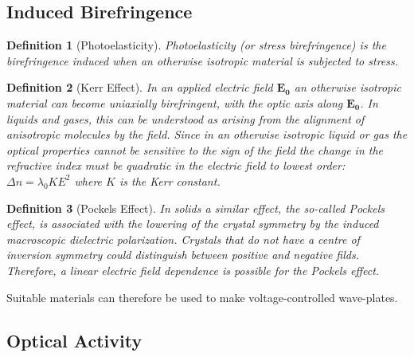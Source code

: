 \documentclass[a4paper]{article}
\theoremstyle{new}
\newtheorem{defi}{Definition}[section]
\begin{document}
\subsection{Induced Birefringence}
\begin{defi}[Photoelasticity]
Photoelasticity (or stress birefringence) is the birefringence induced when an otherwise isotropic material is subjected to stress.
\end{defi}
\begin{defi}[Kerr Effect]
In an applied electric field $\mathbf{E_0}$ an otherwise isotropic material can become uniaxially birefringent, with the optic axis along $\mathbf{E_0}$. In liquids and gases, this can be understood as arising from the alignment of anisotropic molecules by the field. Since in an otherwise isotropic liquid or gas the optical properties cannot be sensitive to the sign of the field the change in the refractive index must be quadratic in the electric field to lowest order: $\Delta n=\lambda_0KE^2$ where $K$ is the Kerr constant. 
\end{defi}
\begin{defi}[Pockels Effect]
In solids a similar effect, the so-called Pockels effect, is associated with the lowering of the crystal symmetry by the induced macroscopic dielectric polarization. Crystals that do not have a centre of inversion symmetry could distinguish between positive and negative filds. Therefore, a linear electric field dependence is possible for the Pockels effect.
\end{defi}
Suitable materials can therefore be used to make voltage-controlled wave-plates.
\subsection{Optical Activity}
\end{document}
